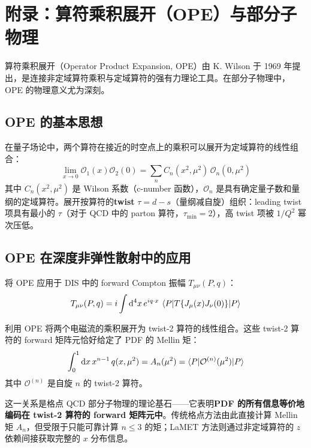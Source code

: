\documentclass[11pt,a4paper]{ctexart}
\begin{document}
\section{附录：算符乘积展开（OPE）与部分子物理}

算符乘积展开（Operator Product Expansion, OPE）由 K. Wilson 于 1969 年提出，是连接非定域算符乘积与定域算符的强有力理论工具。在部分子物理中，OPE 的物理意义尤为深刻。

\subsection{OPE 的基本思想}

在量子场论中，两个算符在接近的时空点上的乘积可以展开为定域算符的线性组合：
\begin{equation}
\lim_{x \to 0} \mathcal{O}_1(x) \mathcal{O}_2(0) = \sum_n C_n(x^2, \mu^2) \, \mathcal{O}_n(0, \mu^2)
\end{equation}
其中 $C_n(x^2, \mu^2)$ 是 Wilson 系数（c-number 函数），$\mathcal{O}_n$ 是具有确定量子数和量纲的定域算符。展开按算符的\textbf{twist} $\tau = d - s$（量纲减自旋）组织：leading twist 项具有最小的 $\tau$（对于 QCD 中的 parton 算符，$\tau_{\text{min}} = 2$），高 twist 项被 $1/Q^2$ 幂次压低。

\subsection{OPE 在深度非弹性散射中的应用}

将 OPE 应用于 DIS 中的 forward Compton 振幅 $T_{\mu\nu}(P,q)$：
\begin{equation}
T_{\mu\nu}(P,q) = i \int \mathrm{d}^4 x \, e^{i q \cdot x} \,
\braket{P | T\{ J_\mu(x) J_\nu(0) \} | P}
\end{equation}

利用 OPE 将两个电磁流的乘积展开为 twist-2 算符的线性组合。这些 twist-2 算符的 forward 矩阵元恰好给定了 PDF 的 Mellin 矩：
\begin{equation}
\int_0^1 \mathrm{d}x \, x^{n-1} \, q(x, \mu^2) = A_n(\mu^2) = \braket{P | \mathcal{O}^{(n)}(\mu^2) | P}
\end{equation}
其中 $\mathcal{O}^{(n)}$ 是自旋 $n$ 的 twist-2 算符。

这一关系是格点 QCD 部分子物理的理论基石——它表明\textbf{PDF 的所有信息等价地编码在 twist-2 算符的 forward 矩阵元中}。传统格点方法由此直接计算 Mellin 矩 $A_n$，但受限于只能可靠计算 $n \le 3$ 的矩；LaMET 方法则通过非定域算符的 $z$ 依赖间接获取完整的 $x$ 分布信息。
\end{document}
